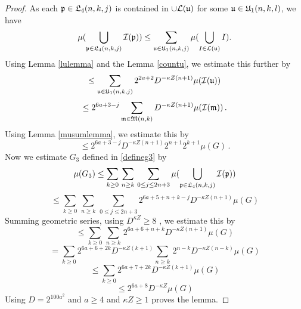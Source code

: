    \begin{proof}
As each $\fp\in \fL_4(n,k,j)$
is contained in $\cup\mathcal{L}(\fu)$ for some
$\fu\in \fU_1(n,k,l)$, we have
\begin{equation}
\mu(\bigcup_{\fp \in \fL_4 (n,k,j)}\sc(\fp))
\le \sum_{\fu\in \fU_1(n,k,j)}
\mu(\bigcup_{I \in \mathcal{L} (\fu)}I).
\end{equation}
Using Lemma \ref{lulemma} and the Lemma \ref{countu}, we estimate this further
    by
\begin{equation}
    \le \sum_{\fu\in \fU_1(n,k,j)}
    2^{2a+2} D^{-\kappa Z(n+1)}
        \mu(\sc(\mathfrak{u}))
\end{equation}
\begin{equation}
    \le 2^{6a+3-j} \sum_{\mathfrak{m}\in \mathfrak{M}(n,k)}
        D^{-\kappa Z(n+1)}
    \mu(\sc(\mathfrak{m}))\,.
\end{equation}
Using Lemma \ref{musumlemma}, we estimate this by
    \begin{equation}
        \le
2^{6a + 3-j}  D^{-\kappa Z(n+1)}
        2^{n+1}2^{k+1}\mu(G)\, .
\end{equation}
Now we estimate $G_3$ defined in \eqref{defineg3} by
\begin{equation}
    \mu(G_3)\le \sum_{k\ge 0}\, \sum_{n \geq k}\,
    \sum_{0\le j\le 2n+3}
    \mu(\bigcup_{\fp \in \fL_4 (n,k,j)}
    \sc(\fp))
\end{equation}
\begin{equation}
    \le \sum_{k\ge 0}\, \sum_{n \geq k}\,
    \sum_{0\le j\le 2n+3}
    2^{6a + 5 + n + k -j}  D^{-\kappa Z(n+1)}\mu(G)
\end{equation}
Summing geometric series, using $D^{\kappa Z}\ge 8$ , we estimate this by
\begin{equation}
    \le \sum_{k\ge 0}\, \sum_{n \geq k}\,
    2^{6a + 6 + n + k}  D^{-\kappa Z(n+1)}\mu(G)
\end{equation}
\begin{equation}
    = \sum_{k\ge 0} 2^{6a + 6 + 2k} D^{-\kappa Z(k+1)} \sum_{n \geq k}\,
    2^{n - k}  D^{-\kappa Z(n-k)}\mu(G)
\end{equation}
\begin{equation}
    \le \sum_{k\ge 0} 2^{6a + 7 + 2k}  D^{-\kappa Z(k+1)}\mu(G)
\end{equation}
\begin{equation}
    \le 2^{6a + 8}  D^{-\kappa Z}\mu(G)
\end{equation}
Using $D = 2^{100a^2}$ and $a \ge 4$ and $\kappa Z \ge 1$ proves the lemma.
\end{proof}

